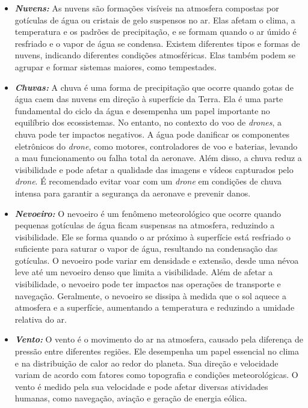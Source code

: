 \documentclass[a4paper, 12pt, onecolumn,singlespacing]{article}
\begin{document}
\begin{itemize}
		\item \textbf{\textit{Nuvens: }}As nuvens são formações visíveis na atmosfera compostas por gotículas de água ou cristais de gelo suspensos no ar. Elas afetam o clima, a temperatura e os padrões de precipitação, e se formam quando o ar úmido é resfriado e o vapor de água se condensa. Existem diferentes tipos e formas de nuvens, indicando diferentes condições atmosféricas. Elas também podem se agrupar e formar sistemas maiores, como tempestades. 
		
		\item \textbf{\textit{Chuvas: }} A chuva é uma forma de precipitação que ocorre quando gotas de água caem das nuvens em direção à superfície da Terra. Ela é uma parte fundamental do ciclo da água e desempenha um papel importante no equilíbrio dos ecossistemas. No entanto, no contexto do voo de \textit{drones}, a chuva pode ter impactos negativos. A água pode danificar os componentes eletrônicos do \textit{drone}, como motores, controladores de voo e baterias, levando a mau funcionamento ou falha total da aeronave. Além disso, a chuva reduz a visibilidade e pode afetar a qualidade das imagens e vídeos capturados pelo \textit{drone}. É recomendado evitar voar com um \textit{drone} em condições de chuva intensa para garantir a segurança da aeronave e prevenir danos.
		
		\item \textbf{\textit{Nevoeiro: }} O nevoeiro é um fenômeno meteorológico que ocorre quando pequenas gotículas de água ficam suspensas na atmosfera, reduzindo a visibilidade. Ele se forma quando o ar próximo à superfície está resfriado o suficiente para saturar o vapor de água, resultando na condensação das gotículas. O nevoeiro pode variar em densidade e extensão, desde uma névoa leve até um nevoeiro denso que limita a visibilidade. Além de afetar a visibilidade, o nevoeiro pode ter impactos nas operações de transporte e navegação. Geralmente, o nevoeiro se dissipa à medida que o sol aquece a atmosfera e a superfície, aumentando a temperatura e reduzindo a umidade relativa do ar.
		
		\item \textbf{\textit{Vento: }} O vento é o movimento do ar na atmosfera, causado pela diferença de pressão entre diferentes regiões. Ele desempenha um papel essencial no clima e na distribuição de calor ao redor do planeta. Sua direção e velocidade variam de acordo com fatores como topografia e condições meteorológicas. O vento é medido pela sua velocidade e pode afetar diversas atividades humanas, como navegação, aviação e geração de energia eólica.
		

\end{itemize}
\end{document}
